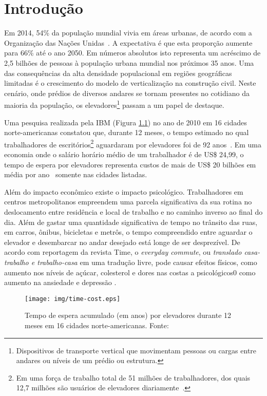 \chapter{Introdução} \label{chap:intro}


Em 2014, 54\% da população mundial vivia em áreas urbanas, de acordo com a
Organização das Nações Unidas~\cite{UN14}. A expectativa é que esta proporção
aumente para 66\% até o ano 2050. Em números absolutos isto representa um
acréscimo de 2,5 bilhões de pessoas à população urbana mundial nos próximos 35
anos. Uma das consequências da alta densidade populacional em regiões
geográficas limitadas é o crescimento do modelo de verticalização na construção
civil. Neste cenário, onde prédios de diversos andares se tornam presentes no
cotidiano da maioria da população, os elevadores\footnote{Dispositivos de
transporte vertical que movimentam pessoas ou cargas entre andares ou níveis de
um prédio ou estrutura.} passam a um papel de destaque.

Uma pesquisa realizada pela IBM (Figura \ref{fig:timecost}) no ano de 2010 em 16
cidades norte-americanas constatou que, durante 12 meses, o tempo estimado no
qual trabalhadores de escritórios\footnote{Em uma força de trabalho total de 51
milhões de trabalhadores, dos quais 12,7 milhões são usuários de elevadores
diariamente~\cite{IBM10}.} aguardaram por elevadores foi de 92
anos~\cite{IBM10}. Em uma economia onde o salário horário médio de um
trabalhador é de US\$ 24,99, o tempo de espera por elevadores representa custos
de mais de US\$ 20 bilhões em média por ano~\cite{BLS15} somente nas cidades
listadas.

Além do impacto econômico existe o impacto psicológico. Trabalhadores em centros
metropolitanos empreendem uma parcela significativa da sua rotina no
deslocamento entre residência e local de trabalho e no caminho inverso ao final
do dia. Além de gastar uma quantidade significativa de tempo no trânsito das
ruas, em carros, ônibus, bicicletas e metrôs, o tempo compreendido entre
aguardar o elevador e desembarcar no andar desejado está longe de ser
desprezível. De acordo com reportagem da revista Time, o \textit{everyday
commute}, ou \textit{translado casa-trabalho e trabalho-casa} em uma tradução
livre, pode causar efeitos físicos, como aumento nos níveis de açúcar,
colesterol e dores nas costas a psicológicos0 como aumento na ansiedade e
depressão \cite{Kylstra14}.

\begin{figure}[htb!]
\centering\texttt{[image: img/time-cost.eps]}
\caption[Tempo de espera acumulado (em anos).]{\label{fig:timecost}Tempo de espera acumulado (em anos) por elevadores
durante 12 meses em 16 cidades norte-americanas. Fonte:~\cite{IBM10}}
\end{figure}

